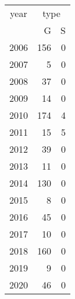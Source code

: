 \footnotesize\begin{tabular}[t]{lrr}
\toprule
\multicolumn{1}{c}{year} & \multicolumn{2}{c}{type} \\
\cmidrule(l{3pt}r{3pt}){1-1} \cmidrule(l{3pt}r{3pt}){2-3}
  & G & S\\
\midrule
2006 & 156 & 0\\
2007 & 5 & 0\\
2008 & 37 & 0\\
2009 & 14 & 0\\
2010 & 174 & 4\\
2011 & 15 & 5\\
2012 & 39 & 0\\
2013 & 11 & 0\\
2014 & 130 & 0\\
2015 & 8 & 0\\
2016 & 45 & 0\\
2017 & 10 & 0\\
2018 & 160 & 0\\
2019 & 9 & 0\\
2020 & 46 & 0\\
\bottomrule
\end{tabular}
